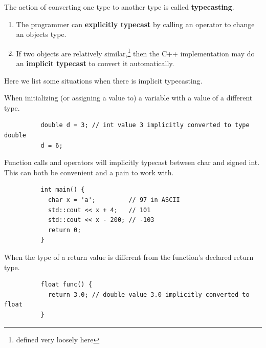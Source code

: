 \documentclass{article}
\newcounter{definition}[section]
\begin{document}
      \begin{definition}[Typecasting]
        \label{def:typecasting}
        The action of converting one type to another type is called \textbf{typecasting}. 
        \begin{enumerate}
          \item The programmer can \textbf{explicitly typecast} by calling an operator to change an objects type. 
          \item If two objects are relatively similar,\footnote{defined very loosely here} then the C++ implementation may do an \textbf{implicit typecast} to convert it automatically. 
        \end{enumerate}
      \end{definition} 

      Here we list some situations when there is implicit typecasting. 

      \begin{lemma}
        \label{thm:variable-initialization}
        When initializing (or assigning a value to) a variable with a value of a different type. 
        \begin{lstlisting}
          double d = 3; // int value 3 implicitly converted to type double 
          d = 6; 
        \end{lstlisting}
      \end{lemma}

      \begin{lemma}
        \label{thm:function-and-operators}
        Function calls and operators will implicitly typecast between char and signed int. This can both be convenient and a pain to work with. 
        \begin{lstlisting}
          int main() { 
            char x = 'a';         // 97 in ASCII
            std::cout << x + 4;   // 101
            std::cout << x - 200; // -103
            return 0; 
          }
        \end{lstlisting}
      \end{lemma}

      \begin{lemma}
        \label{thm:return-types}
        When the type of a return value is different from the function's declared return type. 
        \begin{lstlisting}
          float func() {
            return 3.0; // double value 3.0 implicitly converted to float
          }
        \end{lstlisting}
      \end{lemma}
\end{document}
